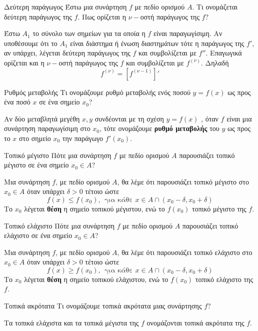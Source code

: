 \begin{Orismosbox}{Δεύτερη παράγωγος}
\label{orismos:deyterh_paragwgos}
Έστω μια συνάρτηση $f$ με πεδίο ορισμού $A$. Τι ονομάζεται δεύτερη παράγωγος της $f$. Πως ορίζεται η $\nu-$οστή παράγωγος της $f$?
\end{Orismosbox}
\apanthsh
Έστω $ A_1 $  το σύνολο των σημείων για τα οποία η $ f $ είναι παραγωγίσιμη. Αν υποθέσουμε ότι το $ A_1 $ είναι διάστημα ή ένωση διαστημάτων τότε η παράγωγος της $ f' $, αν υπάρχει, λέγεται δεύτερη παράγωγος της $ f $ και συμβολίζεται με $ f'' $. Επαγωγικά ορίζεται και η $ \nu- $οστή παράγωγος της $ f $ και συμβολίζεται με $ f^{(\nu)} $. Δηλαδή
\[ f^{(\nu)}=\left[f^{(\nu-1)}\right]' \]
\begin{Orismosbox}{Ρυθμός μεταβολής}
\label{orismos:rythmos_metavolhs}
Τι ονομάζουμε ρυθμό μεταβολής ενός ποσού $ y=f(x) $ ως προς ένα ποσό $ x $ σε ένα σημείο $ x_0 $?
\end{Orismosbox}
\apanthsh
Αν δύο μεταβλητά μεγέθη  $ x , y $ συνδέονται με τη σχέση $ y = f(x) $ , όταν  $ f  $ είναι μια συνάρτηση παραγωγίσιμη στο $ x_0 $, τότε ονομάζουμε \textbf{ρυθμό μεταβολής} του $ y $ ως προς το $ x $ στο σημείο  $ x_0 $ την παράγωγο $ f '(x_0) $.
\begin{Orismosbox}{Τοπικό μέγιστο}
\label{orismos:topiko_megisto}
Πότε μια συνάρτηση $f$ με πεδίο ορισμού $A$ παρουσιάζει τοπικό μέγιστο σε ένα σημείο $x_0\in A$?
\end{Orismosbox}
\apanthsh
Μια συνάρτηση $ f $, με πεδίο ορισμού $ A $, θα λέμε ότι παρουσιάζει τοπικό μέγιστο στο $ x_0\in A $ όταν υπάρχει $ \delta>0 $ τέτοιο ώστε
\[ f(x)\leq f(x_0), \ \ \textrm{για κάθε }x\in A\cap(x_0-\delta,x_0+\delta) \]
Το $ x_0 $ λέγεται \textbf{θέση} η σημείο τοπικού μέγιστου, ενώ το $ f(x_0) $ τοπικό μέγιστο της $ f $.
\begin{Orismosbox}{Τοπικό ελάχιστο}
\label{orismos:topiko_elaxisto}
Πότε μια συνάρτηση $f$ με πεδίο ορισμού $A$ παρουσιάζει τοπικό ελάχιστο σε ένα σημείο $x_0\in A$?
\end{Orismosbox}
\apanthsh
Μια συνάρτηση $ f $, με πεδίο ορισμού $ A $, θα λέμε ότι παρουσιάζει τοπικό ελάχιστο στο $ x_0\in A $ όταν υπάρχει $ \delta>0 $ τέτοιο ώστε
\[ f(x)\geq f(x_0), \ \ \textrm{για κάθε }x\in A\cap(x_0-\delta,x_0+\delta) \]
Το $ x_0 $ λέγεται \textbf{θέση} η σημείο τοπικού ελάχιστου, ενώ το $ f(x_0) $ τοπικό ελάχιστο της $ f $.
\begin{Orismosbox}{Τοπικά ακρότατα}
\label{orismos:topika_akrotata}
Τι ονομάζουμε τοπικά ακρότατα μιας συνάρτησης $f$?
\end{Orismosbox}
\apanthsh
Τα τοπικά ελάχιστα και τα τοπικά μέγιστα της $ f $ ονομάζονται τοπικά ακρότατα της $ f $.

